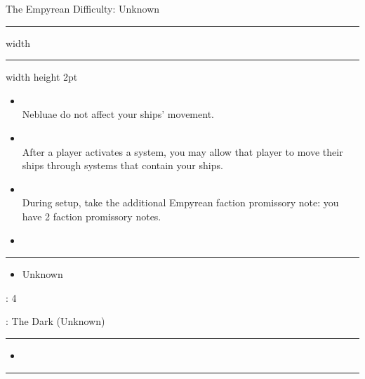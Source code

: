 \newpage
{\handel\Huge The Empyrean} \hfill {\Large Difficulty: Unknown} \vspace{-4pt}\\
\hrule width \hsize \kern 1mm \hrule width \hsize height 2pt


\begin{multicols}{2}


\begin{itemize}
\item {}\\
Nebluae do not affect your ships' movement.
\item {}\\
After a player activates a system, you may allow that player to move their ships through systems that contain your ships.
\item {}\\
During setup, take the additional Empyrean faction promissory note: you have 2 faction promissory notes.
\item 
\end{itemize}


\vspace{-10pt}\rule{\hsize}{0.4pt}\vspace{5pt}


\vspace{-5pt}
\begin{multicols}{2}
\begin{itemize}
\item Unknown %
\end{itemize}
\end{multicols}

\vspace{-5pt}
: 4

\vspace{2pt}
: The Dark (Unknown) %

\rule{\hsize}{0.4pt}\vspace{5pt}


\begin{itemize}
\item \tap
\end{itemize}

\vspace{-10pt}\rule{\hsize}{0.4pt}\vspace{5pt}


\end{multicols}
